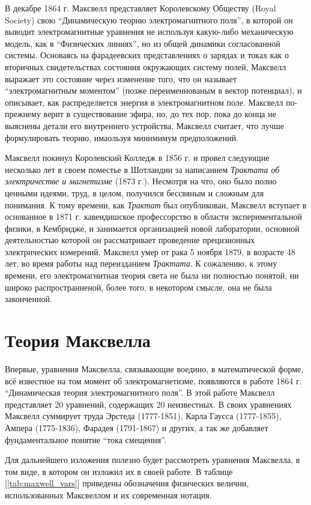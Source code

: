 \documentclass[12pt, oneside, a4paper]{article}
\begin{document}
В декабре 1864 г. Максвелл представляет Королевскому Обществу (Royal Society) свою ``Динамическую теорию электромагнитного поля'', в которой он выводит электромагнитные уравнения не используя какую-либо механическую модель, как в ``Физических линиях'', но из общей динамики согласованной системы. Основаясь на фарадеевских представлениях о зарядах и токах как о вторичных свидетельствах состояния окружающих систему полей, Максвелл выражает это состояние через изменение того, что он называет ``электромагнитным моментом'' (позже переименнованым в вектор потенциал), и описывает, как распределяется энергия в электромагнитном поле. Максвелл по-прежнему верит в существование эфира, но, до тех пор, пока до конца не выяснены детали его внутреннего устройства, Максвелл считает, что лучше формулировать теорию, имаользуя минимимум предположений. 

Максвелл покинул Королевский Колледж в 1856 г. и провел следующие несколько лет в своем поместье в Шотландии за написанием  \emph{Трактата об электричестве и магнетизме} (1873 г.). Несмотря на что, оно было полно ценными идеями, труд, в целом, получился бессвяным и сложным для понимания. К тому времени, как \emph{Трактат} был опубликован, Максвелл вступает в основанное в 1871 г. кавендишское профессорство в области экспериментальной физики, в Кембридже, и занимается организацией новой лаборатории, основной деятельностью которой он рассматривает проведение прецизионных электрических измерений. Максвелл умер от рака 5 ноября 1879, в возрасте 48 лет, во время работы над переизданием \emph{Трактата}. К сожалению, к этому времени, его электромагнитная теория света не была ни полностью понятой, ни широко распространненой, более того, в некотором смысле, она не была законченной.
\section*{Теория Максвелла}
Впервые, уравнения Максвелла, связывающие воедино, в математической форме, всё известное на том момент об электромагнетизме, появляются в работе 1864 г. ``Динамическая теория электромагнитного поля''. В этой работе Максвелл представляет 20 уравнений, содержащих 20 неизвестных.  В своих уравнениях Максвелл суммирует труда Эрстеда (1777-1851), Карла Гаусса (1777-1855), Ампера (1775-1836), Фарадея (1791-1867) и других, а так же добавляет фундаментальное понятие ``тока смещения''.

Для дальнейшего изложения полезно будет рассмотреть  уравнения Максвелла, в том виде, в котором он изложил их в своей работе. В таблице [\ref{tab:maxwell_vars}] приведены обозначения физических велични, использованных Максвеллом и их современная нотация. 
\end{document}
